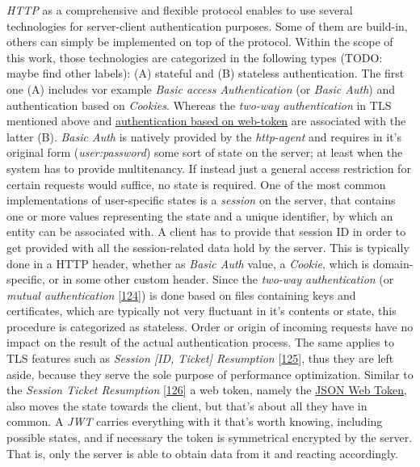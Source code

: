 \documentclass[12pt,english,a4paper,titlepage,cleardoublepage=empty,dottedtoc]{report}
\begin{document}
\emph{HTTP} as a comprehensive and flexible protocol enables to use
several technologies for server-client authentication purposes. Some of
them are build-in, others can simply be implemented on top of the
protocol. Within the scope of this work, those technologies are
categorized in the following types (TODO: maybe find other labels): (A)
stateful and (B) stateless authentication. The first one (A) includes
vor example \emph{Basic access Authentication} (or \emph{Basic Auth})
and authentication based on \emph{Cookies}. Whereas the \emph{two-way
authentication} in TLS mentioned above and
\protect\hyperlink{link_jwt}{authentication based on web-token} are
associated with the latter (B). \emph{Basic Auth} is natively provided
by the \emph{http-agent} and requires in it's original form
(\emph{user:password}) some sort of state on the server; at least when
the system has to provide multitenancy. If instead just a general access
restriction for certain requests would suffice, no state is required.
One of the most common implementations of user-specific states is a
\emph{session} on the server, that contains one or more values
representing the state and a unique identifier, by which an entity can
be associated with. A client has to provide that session ID in order to
get provided with all the session-related data hold by the server. This
is typically done in a HTTP header, whether as \emph{Basic Auth} value,
a \emph{Cookie}, which is domain-specific, or in some other custom
header. Since the \emph{two-way authentication} (or \emph{mutual
authentication}
{[}\protect\hyperlink{ref-web_2017_wikipedia_mutual-auth}{124}{]}) is
done based on files containing keys and certificates, which are
typically not very fluctuant in it's contents or state, this procedure
is categorized as stateless. Order or origin of incoming requests have
no impact on the result of the actual authentication process. The same
applies to TLS features such as \emph{Session {[}ID, Ticket{]}
Resumption}
{[}\protect\hyperlink{ref-book_2013_networking-101_tls-session-resumption}{125}{]},
thus they are left aside, because they serve the sole purpose of
performance optimization. Similar to the \emph{Session Ticket
Resumption}
{[}\protect\hyperlink{ref-web_spec_tls-session-ticket-resumption}{126}{]}
a web token, namely the \protect\hyperlink{link_jwt}{JSON Web Token},
also moves the state towards the client, but that's about all they have
in common. A \emph{JWT} carries everything with it that's worth knowing,
including possible states, and if necessary the token is symmetrical
encrypted by the server. That is, only the server is able to obtain data
from it and reacting accordingly.
\end{document}
